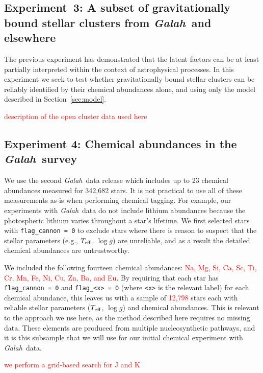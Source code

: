 \documentclass[twocolumn]{aastex62}
\newcommand\teff{T_{\rm eff}}
\newcommand\logg{\log{g}}
\newcommand{\project}[1]{\textsl{#1}}
\newcommand{\Galah}{\project{Galah}}
\newcommand{\todo}[1]{\textcolor{red}{#1}}
\begin{document}
\subsection{Experiment~3: A subset of gravitationally bound stellar clusters 
			from \Galah\ and elsewhere}
\label{sec:exp3}

The previous experiment has demonstrated that the latent factors can be at least
partially interpreted within the context of astrophysical processes. In this
experiment we seek to test whether gravitationally bound stellar clusters can be
reliably identified by their chemical abundances alone, and using only the model 
described in Section~\ref{sec:model}.

\todo{description  of the open cluster data used here}





\subsection{Experiment 4: Chemical abundances in the \Galah\ survey}
\label{sec:exp4}


We use the second \Galah\ data release \citep{Buder:2018a} which
includes up to 23 chemical abundances measured for 342,682
stars. It is not practical to use all of these measurements as-is
when performing chemical tagging. For example, our experiments
with \Galah\ data do not include lithium abundances because the
photospheric lithium varies throughout a star's lifetime. 
We first selected stars with \texttt{flag\_cannon = 0} to exclude
stars where there is reason to suspect that the stellar parameters
(e.g., $\teff$, $\logg$) are unreliable, and as a result the 
detailed chemical abundances are untrustworthy. 

We included the following fourteen chemical abundances: \todo{Na, Mg, 
Si, Ca, Sc, Ti, Cr, Mn, Fe, Ni, Cu, Zn, Ba, and Eu}.
By requiring that each star has \texttt{flag\_cannon = 0} and
\texttt{flag\_<x> = 0} (where \texttt{<x>} is the relevant label)
for each chemical abundance, this leaves
us with a sample of \todo{12,798} stars each with reliable stellar
parameters ($\teff$, $\logg$) and chemical abundances.
This is relevant to the approach we use here, as the method
described here requires no missing data.
These elements are produced from multiple nucleosynthetic
pathways, and it is this subsample that we will use for 
our initial chemical experiment with \Galah\ data.


\todo{we perform a grid-based search for J and K}
\end{document}
